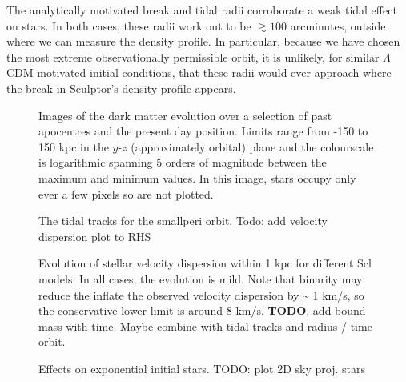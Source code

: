 The analytically motivated break and tidal radii corroborate a weak
tidal effect on stars. In both cases, these radii work out to be
\(\gtrsim 100\) arcminutes, outside where we can measure the density
profile. In particular, because we have chosen the most extreme
observationally permissible orbit, it is unlikely, for similar
\(\Lambda\)CDM motivated initial conditions, that these radii would ever
approach where the break in Sculptor's density profile appears.

\begin{figure}
\centering
{}
\caption[Sculptor simulation snapshots]{Images of the dark matter
evolution over a selection of past apocentres and the present day
position. Limits range from -150 to 150 kpc in the \(y\)-\(z\)
(approximately orbital) plane and the colourscale is logarithmic
spanning 5 orders of magnitude between the maximum and minimum values.
In this image, stars occupy only ever a few pixels so are not
plotted.}\label{fig:scl_sim_images}
\end{figure}

\begin{figure}
\centering
{}
\caption[Sculptor Tidal Tracks]{The tidal tracks for the smallperi
orbit. Todo: add velocity dispersion plot to
RHS}\label{fig:scl_tidal_track}
\end{figure}

\begin{figure}
\centering
{}
\caption[Sculptor velocity dispersion evolution]{Evolution of stellar
velocity dispersion within 1 kpc for different Scl models. In all cases,
the evolution is mild. Note that binarity may reduce the inflate the
observed velocity dispersion by \textasciitilde{} 1 km/s, so the
conservative lower limit is around 8 km/s. \textbf{TODO}, add bound mass
with time. Maybe combine with tidal tracks and radius / time orbit.}
\end{figure}

\begin{figure}
\centering
{}
\caption[Sculptor initial and final density profiles]{Effects on
exponential initial stars. TODO: plot 2D sky proj.
stars}\label{fig:scl_smallperi_i_f}
\end{figure}


